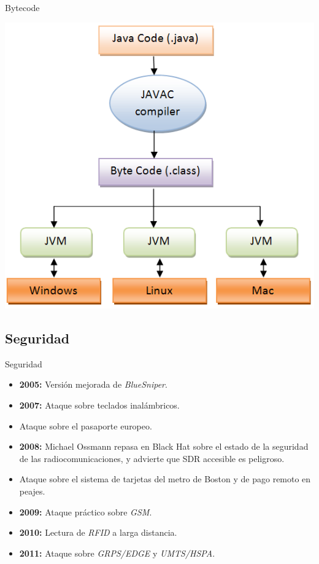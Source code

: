 \documentclass{beamer}
\begin{document}
\begin{frame}{Bytecode}

\begin{center}
\includegraphics[scale=0.3]{java-program-execution2.png}
\end{center}

\end{frame}

\subsection{Seguridad}

\begin{frame}{Seguridad}

\begin{itemize}
	\item \textbf{2005:} Versión mejorada de \emph{BlueSniper}.
	\item \textbf{2007:} Ataque sobre teclados inalámbricos.
	\item Ataque sobre el pasaporte europeo.
	\item \textbf{2008:} Michael Ossmann repasa en Black Hat sobre el estado de la seguridad de las radiocomunicaciones, y advierte que SDR accesible es peligroso.
	\item Ataque sobre el sistema de tarjetas del metro de Boston y de pago remoto en peajes.
	\item \textbf{2009:} Ataque práctico sobre \emph{GSM}.
	\item \textbf{2010:} Lectura de \emph{RFID} a larga distancia.
	\item \textbf{2011:} Ataque sobre \emph{GRPS/EDGE} y \emph{UMTS/HSPA}.
\end{itemize}

\end{frame}
\end{document}
